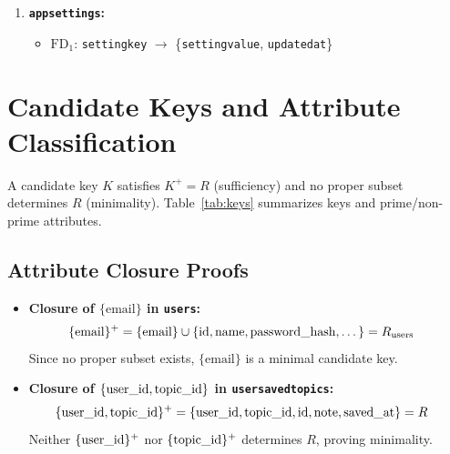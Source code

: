 \documentclass[12pt,a4paper]{report}
\DeclareRobustCommand{\_}{\textunderscore\allowbreak}
\begin{document}
\begin{enumerate}
    \begin{itemize}
        \item $\mathrm{FD}_1$: \texttt{id} $\rightarrow$ \{\texttt{user\_id}, \texttt{action}, \texttt{entity}, \texttt{entity\_id}, \texttt{detail}, \texttt{created\_at}\}
    \end{itemize}
    \item \textbf{\texttt{app\_settings}:}
    \begin{itemize}
        \item $\mathrm{FD}_1$: \texttt{setting\_key} $\rightarrow$ \{\texttt{setting\_value}, \texttt{updated\_at}\}
    \end{itemize}
\end{enumerate}

\section{Candidate Keys and Attribute Classification}
A candidate key $K$ satisfies $K^+ = R$ (sufficiency) and no proper subset determines $R$ (minimality). Table~\ref{tab:keys} summarizes keys and prime/non-prime attributes.

\subsection{Attribute Closure Proofs}
\begin{itemize}
    \item \textbf{Closure of $\{\text{email}\}$ in \texttt{users}:}
    \begin{align*}
    \{\text{email}\}^+ &= \{\text{email}\} \cup \{\text{id}, \text{name}, \text{password\_hash}, \dots\} = R_{\text{users}}
    \end{align*}
    Since no proper subset exists, $\{\text{email}\}$ is a minimal candidate key.
    \item \textbf{Closure of $\{\text{user\_id}, \text{topic\_id}\}$ in \texttt{user\_saved\_topics}:}
    \begin{align*}
    \{\text{user\_id}, \text{topic\_id}\}^+ &= \{\text{user\_id}, \text{topic\_id}, \text{id}, \text{note}, \text{saved\_at}\} = R
    \end{align*}
    Neither $\{\text{user\_id}\}^+$ nor $\{\text{topic\_id}\}^+$ determines $R$, proving minimality.
\end{itemize}
\end{document}
